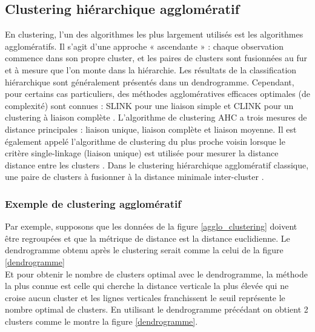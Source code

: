 \subsection{Clustering hiérarchique agglomératif}
En clustering, l'un des algorithmes les plus largement utilisés est les algorithmes agglomératifs. Il s'agit d'une approche « ascendante » : chaque observation commence dans son propre cluster, et les paires de clusters sont fusionnées au fur et à mesure que l'on monte dans la hiérarchie. Les résultats de la classification hiérarchique sont généralement présentés dans un dendrogramme. Cependant, pour certains cas particuliers, des méthodes agglomératives efficaces optimales (de complexité) sont connues : SLINK pour une liaison simple et CLINK pour un clustering à liaison complète \cite{sasirekha2013agglomerative}.
L’algorithme de clustering AHC a trois mesures de distance principales : liaison unique, liaison complète et liaison moyenne. Il est également appelé l’algorithme de clustering du plus proche voisin lorsque le critère single-linkage (liaison unique) est utilisée pour mesurer la distance distance entre les clusters \cite{zhou2016method}.
Dans le clustering hiérarchique agglomératif classique, une paire de clusters à fusionner à la distance minimale inter-cluster \cite{wu2004clustering}.

\subsubsection{Exemple de clustering agglomératif}

Par exemple, supposons que les données de la figure \ref{agglo_clustering} doivent être regroupées et que la métrique de distance est la distance euclidienne.
Le dendrogramme obtenu après le clustering serait comme la celui de la figure \ref{dendrogramme} \\
Et pour obtenir le nombre de clusters optimal avec le dendrogramme, la méthode la plus connue est celle qui cherche la distance verticale la plus élevée qui ne croise aucun cluster et les lignes verticales franchissent le seuil représente le nombre optimal de clusters. En utilisant le dendrogramme précédant on obtient 2 clusters comme le montre la figure \ref{dendrogramme}.

